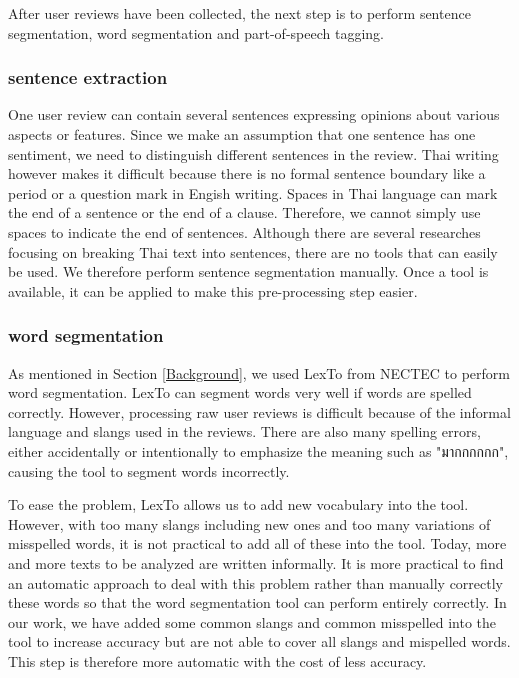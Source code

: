 After user reviews have been collected, the next step is to perform sentence segmentation, word segmentation and part-of-speech tagging. 

\subsubsection{sentence extraction}
One user review can contain several sentences expressing opinions about various aspects or features. 
Since we make an assumption that one sentence has one sentiment, we need to distinguish different sentences in the review. Thai writing however makes it difficult because there is no formal sentence boundary like a period or a question mark in Engish writing. Spaces in Thai language can mark the end of a sentence or the end of a clause. Therefore, we cannot simply use spaces to indicate the end of sentences. Although there are several researches focusing on breaking Thai text into sentences, there are no tools that can easily be used. We therefore perform sentence segmentation manually. Once a tool is available, it can be applied to make this pre-processing step easier. 

\subsubsection{word segmentation}
As mentioned in Section \ref{Background}, we used LexTo\cite{LexTo} from NECTEC to perform word segmentation. LexTo can segment words very well if words are spelled correctly. However, processing raw user reviews is difficult because of the informal language and slangs used in the reviews. There are also many spelling errors, either accidentally or intentionally to emphasize the meaning such as "{มากกกกกก}", causing the tool to segment words incorrectly. 

To ease the problem, LexTo allows us to add new vocabulary into the tool. However, with too many slangs including new ones and too many variations of misspelled words, it is not practical to add all of these into the tool. Today, more and more texts to be analyzed are written informally. It is more practical to find an automatic approach to deal with this problem rather than manually correctly these words so that the word segmentation tool can perform entirely correctly. In our work, we have added some common slangs and common misspelled into the tool to increase accuracy but are not able to cover all slangs and mispelled words. This step is therefore more automatic with the cost of less accuracy.

